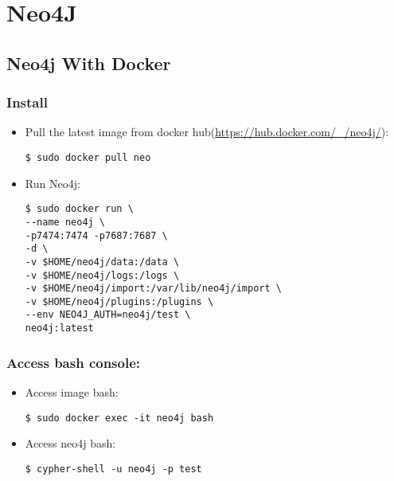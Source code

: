 \chapter{Neo4J}

\section {Neo4j With Docker}

\subsection{Install}
\begin{itemize}
\item Pull the latest image from docker hub(\url{https://hub.docker.com/_/neo4j/}):
	
	
\begin{verbatim}
$ sudo docker pull neo
\end{verbatim}
	
	
\item Run Neo4j:
	
\begin{verbatim}
$ sudo docker run \
--name neo4j \
-p7474:7474 -p7687:7687 \
-d \
-v $HOME/neo4j/data:/data \
-v $HOME/neo4j/logs:/logs \
-v $HOME/neo4j/import:/var/lib/neo4j/import \
-v $HOME/neo4j/plugins:/plugins \
--env NEO4J_AUTH=neo4j/test \
neo4j:latest
\end{verbatim}

\end{itemize}	
\subsection{Access bash console:}	
\begin{itemize}
	\item Access image bash:
	
\begin{verbatim}
$ sudo docker exec -it neo4j bash
\end{verbatim}
	
	
	\item Access neo4j bash:
	
\begin{verbatim}
$ cypher-shell -u neo4j -p test
\end{verbatim}

\end{itemize}	
	
